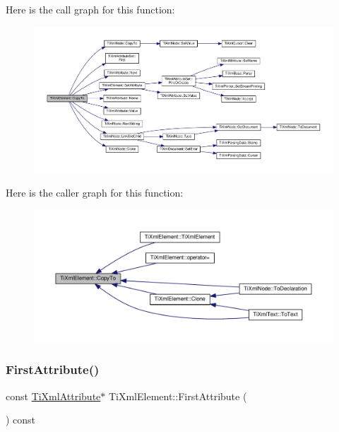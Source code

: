 Here is the call graph for this function\+:
\nopagebreak
\begin{figure}[H]
\begin{center}
\leavevmode
\includegraphics[width=350pt]{class_ti_xml_element_ab931f2208ed76ba03465d8a1f86b5935_cgraph}
\end{center}
\end{figure}
Here is the caller graph for this function\+:
\nopagebreak
\begin{figure}[H]
\begin{center}
\leavevmode
\includegraphics[width=350pt]{class_ti_xml_element_ab931f2208ed76ba03465d8a1f86b5935_icgraph}
\end{center}
\end{figure}
\mbox{\label{class_ti_xml_element_a003131b1bbf0b8054b11571c1b9a4d3a}} 
\subsubsection{\texorpdfstring{First\+Attribute()}{FirstAttribute()}\hspace{0.1cm}{\footnotesize\ttfamily [1/2]}}
{\footnotesize\ttfamily const \hyperlink{class_ti_xml_attribute}{Ti\+Xml\+Attribute}$\ast$ Ti\+Xml\+Element\+::\+First\+Attribute (\begin{DoxyParamCaption}{ }\end{DoxyParamCaption}) const\hspace{0.3cm}{\ttfamily [inline]}}



